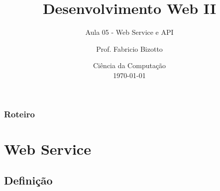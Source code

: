 \documentclass[
	9pt, %
	t, %
]{beamer}
\title[DesWebII]{Desenvolvimento Web II} %
\subtitle{Aula 05 - Web Service e API} %
\author[Fabricio Bizotto]{Prof. Fabricio Bizotto} %
\institute[IFC]{Instituto Federal Catarinense \\ \smallskip \textit{fabricio.bizotto@ifc.edu.br}} %
\date[\today]{Ciência da Computação \\ \today} %
\begin{document}

\begin{frame}
	\titlepage %
\end{frame}


\begin{frame}
	\frametitle{Roteiro} %
	
	\tableofcontents %
\end{frame}


\section{Web Service} %


\subsection{Definição}
\end{document}
